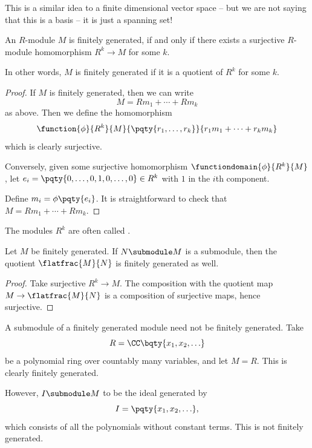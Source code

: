 This is a similar idea to a finite dimensional vector space -- but we are not saying that this is a basis -- it is just a spanning set!

\begin{lemma}
    \label{lem:finitely-generated-modules-surjective-homomorphism}%
    An \(R\)-module \(M\) is finitely generated, if and only if there exists a surjective \(R\)-module homomorphism \(R^k \to M\) for some \(k\).
\end{lemma}

In other words, \(M\) is finitely generated if it is a quotient of \(R^k\) for some \(k\).

\begin{proof}
    If \(M\) is finitely generated, then we can write
    \[
        M = R m_1 + \cdots + R m_k
    \]
    as above. Then we define the homomorphism
    \[
        \function{\phi}{R^k}{M}{\pqty{r_1, \ldots, r_k}}{r_1 m_1 + \cdots + r_k m_k}
    \]
    which is clearly surjective.

    Conversely, given some surjective homomorphism \(\functiondomain{\phi}{R^k}{M}\), let \(e_i = \pqty{0, \ldots, 0, 1, 0, \ldots, 0} \in R^k\) with \(1\) in the \(i\)th component.

    Define \(m_i = \phi\pqty{e_i}\). It is straightforward to check that \(M = R m_1 + \cdots + R m_k\).
\end{proof}

The modules \(R^k\) are often called .

\begin{corollary}
    \label{cor:quotient-finitely-generated}%
    Let \(M\) be finitely generated. If \(N \submodule M\) is a submodule, then the quotient \(\flatfrac{M}{N}\) is finitely generated as well.
\end{corollary}

\begin{proof}
    Take surjective \(R^k \to M\). The composition with the quotient map \(M \to \flatfrac{M}{N}\) is a composition of surjective maps, hence surjective.
\end{proof}

\begin{remark}
    A submodule of a finitely generated module need not be finitely generated. Take
    \[
        R = \CC\bqty{x_1, x_2, \ldots}
    \]
    be a polynomial ring over countably many variables, and let \(M = R\). This is clearly finitely generated.

    However, \(I \submodule M\) to be the ideal generated by
    \[
        I = \pqty{x_1, x_2, \ldots},
    \]
    which consists of all the polynomials without constant terms. This is not finitely generated.
\end{remark}
